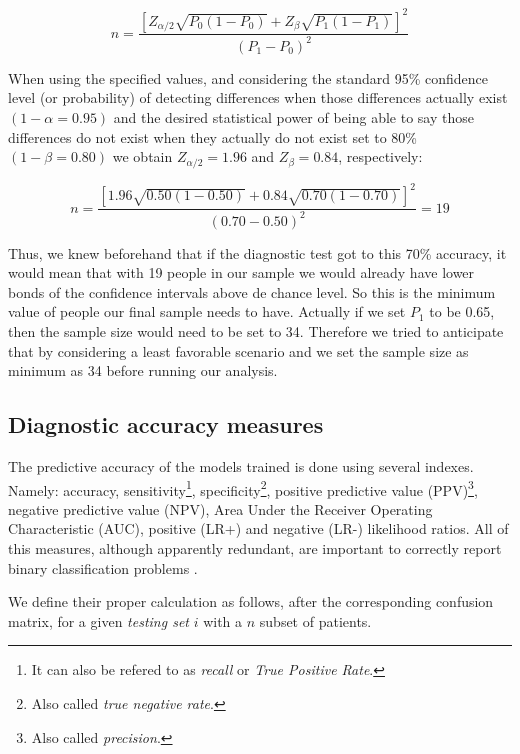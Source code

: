 \documentclass[a4paper,12pt]{elsarticle}  %
\begin{document}
\begin{equation}
	n = \dfrac{[Z_{\alpha/2}\sqrt{P_{0}(1 - P_{0})} + Z_{\beta}\sqrt{P_{1}(1 - P_{1})}]^{2}}{(P_{1} - P_{0})^{2}}
\end{equation}

When using the specified values, and considering the standard 95\% confidence level (or probability) of detecting differences when those differences actually exist $(1 - \alpha = 0.95)$ and the desired statistical power of being able to say those differences do not exist when they actually do not exist set to 80\% $(1 - \beta = 0.80)$ we obtain $Z_{\alpha/2} = 1.96$ and $Z_{\beta} = 0.84$, respectively:

\begin{equation}
	n = \dfrac{[1.96\sqrt{0.50(1 - 0.50)} + 0.84\sqrt{0.70(1 - 0.70)}]^{2}}{(0.70 - 0.50)^{2}} = 19
\end{equation}

Thus, we knew beforehand that if the diagnostic test got to this 70\% accuracy, it would mean that with 19 people in our sample we would already have lower bonds of the confidence intervals above de chance level. So this is the minimum value of people our final sample needs to have. Actually if we set $P_{1}$ to be 0.65, then the sample size would need to be set to 34. Therefore we tried to anticipate that by considering a least favorable scenario and we set the sample size as minimum as 34 before running our analysis.


\subsection{Diagnostic accuracy measures} \label{subsec:Diagnostic_accuracy_measures}

 The predictive accuracy of the models trained is done using several indexes. Namely: accuracy, sensitivity\footnote{It can also be refered to as \textit{recall} or \textit{True Positive Rate}.}, specificity\footnote{Also called \textit{true negative rate}.}, positive predictive value (PPV)\footnote{Also called \textit{precision}.}, negative predictive value (NPV), Area Under the Receiver Operating Characteristic (AUC), positive (LR+) and negative (LR-) likelihood ratios. All of this measures, although apparently redundant, are important to correctly report binary classification problems \cite{Luo2016}. 
 
 We define their proper calculation as follows, after the corresponding confusion matrix, for a given \textit{testing set} $i$ with a $n$ subset of patients.
 
\end{document}
